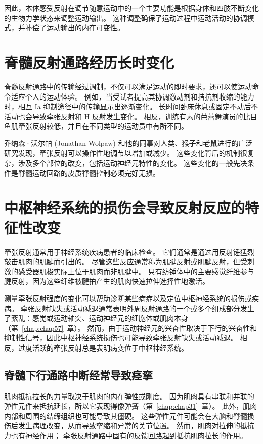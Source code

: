 因此，本体感受反射在调节随意运动中的一个主要功能是根据身体和四肢不断变化的生物力学状态来调整运动输出。
这种调整确保了运动过程中运动活动的协调模式，并补偿了运动输出的内在可变性。



\section{脊髓反射通路经历长时变化}

脊髓反射通路中的传输经过调制，不仅可以满足运动的即时要求，还可以使运动命令适应个人的运动体验。
例如，当受试者提高其协调激动剂和拮抗剂收缩的能力时，相互 Ia 抑制途径中的传输显示出逐渐变化。
长时间卧床休息或固定不动后不活动也会导致牵张反射和 H 反射发生变化。
相反，训练有素的芭蕾舞演员的比目鱼肌牵张反射较低，并且在不同类型的运动员中有所不同。


乔纳森·沃尔帕 (Jonathan Wolpaw) 和他的同事对人类、猴子和老鼠进行的广泛研究发现，牵张反射可以操作性地调节以增加或减少。
这些变化背后的机制很复杂，涉及多个部位的改变，包括运动神经元特性的变化。
这些变化的一般先决条件是脊髓运动回路的皮质脊髓控制必须完好无损。



\section{中枢神经系统的损伤会导致反射反应的特征性改变}

牵张反射通常用于神经系统疾病患者的临床检查。
它们通常是通过用反射锤猛烈敲击肌肉的肌腱而引出的。
尽管这些反应通常称为肌腱反射或肌腱反射，但受刺激的感受器肌梭实际上位于肌肉而非肌腱中。
只有纺锤体中的主要感觉纤维参与腱反射，因为这些纤维被腱拍产生的肌肉快速拉伸选择性地激活。


测量牵张反射强度的变化可以帮助诊断某些病症以及定位中枢神经系统的损伤或疾病。
牵张反射缺失或活动减退通常表明外周反射通路的一个或多个组成部分发生了紊乱：感觉或运动轴突、运动神经元的细胞体或肌肉本身（第~\ref{chap:chap57}~章）。
然而，由于运动神经元的兴奋性取决于下行的兴奋性和抑制性信号，因此中枢神经系统损伤也可能导致牵张反射缺失或活动减退。
相反，过度活跃的牵张反射总是表明病变位于中枢神经系统。



\subsection{脊髓下行通路中断经常导致痉挛}

肌肉抵抗拉长的力量取决于肌肉的内在弹性或刚度。
因为肌肉具有串联和并联的弹性元件来抵抗延长，所以它表现得像弹簧（第~\ref{chap:chap31}~章）。
此外，肌肉内部和周围的结缔组织也可能导致其僵硬。
这些弹性元件可能会在大脑和脊髓损伤后发生病理改变，从而导致挛缩和异常的关节位置。
然而，肌肉对拉伸的抵抗力也有神经作用；
牵张反射通路中固有的反馈回路起到抵抗肌肉拉长的作用。


